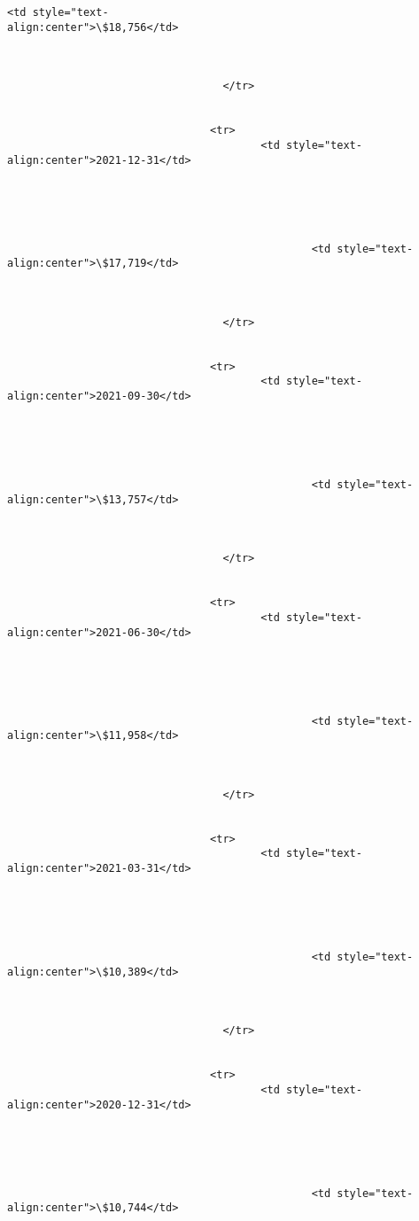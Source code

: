 \documentclass[11pt]{article}
\begin{document}
\begin{Verbatim}[commandchars=\\\{\}]
                                                <td style="text-
align:center">\$18,756</td>



                                  </tr>


                                <tr>
                                        <td style="text-
align:center">2021-12-31</td>





                                                <td style="text-
align:center">\$17,719</td>



                                  </tr>


                                <tr>
                                        <td style="text-
align:center">2021-09-30</td>





                                                <td style="text-
align:center">\$13,757</td>



                                  </tr>


                                <tr>
                                        <td style="text-
align:center">2021-06-30</td>





                                                <td style="text-
align:center">\$11,958</td>



                                  </tr>


                                <tr>
                                        <td style="text-
align:center">2021-03-31</td>





                                                <td style="text-
align:center">\$10,389</td>



                                  </tr>


                                <tr>
                                        <td style="text-
align:center">2020-12-31</td>





                                                <td style="text-
align:center">\$10,744</td>




\end{Verbatim}
\end{document}
